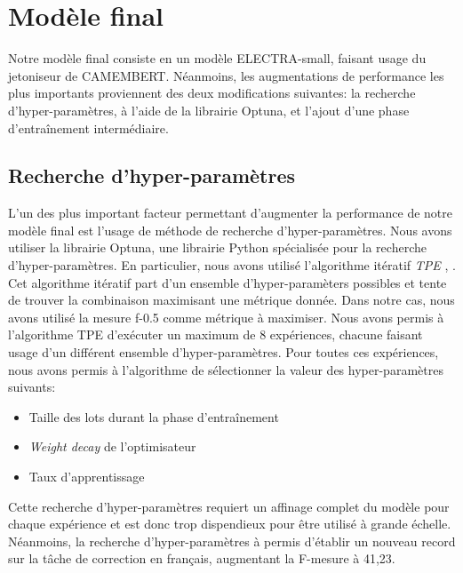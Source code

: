 \documentclass[12pt,twoside,maitrise]{dms}
\theoremstyle{definition}
\numberwithin{equation}{section}
\numberwithin{table}{chapter}
\numberwithin{figure}{chapter}
\begin{document}



\chapter{Modèle final}
Notre modèle final consiste en un modèle ELECTRA-small, faisant usage
du jetoniseur de CAMEMBERT. Néanmoins, les augmentations de
performance les plus importants proviennent des deux modifications
suivantes: la recherche d'hyper-paramètres, à l'aide de la librairie
Optuna, et l'ajout d'une phase d'entraînement intermédiaire.
\section{Recherche d'hyper-paramètres}
L'un des plus important facteur permettant d'augmenter la performance
de notre modèle final est l'usage de méthode de recherche
d'hyper-paramètres. Nous avons utiliser la librairie Optuna, une
librairie Python spécialisée pour la recherche d'hyper-paramètres. En
particulier, nous avons utilisé l'algorithme itératif \textit{TPE}
\cite{watanabe2023treestructuredparzenestimatorunderstanding},
\cite{NIPS2011_86e8f7ab}. Cet algorithme itératif part d'un ensemble
d'hyper-paramèters possibles et tente de trouver la combinaison
maximisant une métrique donnée. Dans notre cas, nous avons utilisé la
mesure f-0.5 comme métrique à maximiser. Nous avons permis à
l'algorithme TPE d'exécuter un maximum de 8 expériences, chacune
faisant usage d'un différent ensemble d'hyper-paramètres. Pour toutes
ces expériences, nous avons permis à l'algorithme  de
sélectionner la valeur des hyper-paramètres suivants:
\begin{itemize}
	\item Taille des lots durant la phase d'entraînement
	\item \textit{Weight decay} de l'optimisateur
	\item Taux d'apprentissage
\end{itemize}

Cette recherche d'hyper-paramètres requiert un affinage complet du
modèle pour chaque expérience et est donc trop dispendieux pour être
utilisé à grande échelle. Néanmoins, la recherche d'hyper-paramètres à
permis d'établir un nouveau record sur la tâche de correction en
français, augmentant la F-mesure à 41,23.
\end{document}
